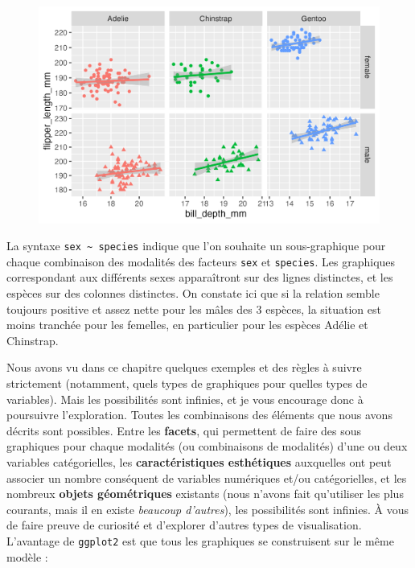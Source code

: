 \documentclass[
  letterpaper,
  DIV=11,
  numbers=noendperiod]{scrreprt}
\begin{document}
\begin{figure}[H]

{\centering \includegraphics{./03-visualization_files/figure-pdf/unnamed-chunk-85-1.png}

}

\end{figure}

La syntaxe \texttt{sex\ \textasciitilde{}\ species} indique que l'on
souhaite un sous-graphique pour chaque combinaison des modalités des
facteurs \texttt{sex} et \texttt{species}. Les graphiques correspondant
aux différents sexes apparaîtront sur des lignes distinctes, et les
espèces sur des colonnes distinctes. On constate ici que si la relation
semble toujours positive et assez nette pour les mâles des 3 espèces, la
situation est moins tranchée pour les femelles, en particulier pour les
espèces Adélie et Chinstrap.

Nous avons vu dans ce chapitre quelques exemples et des règles à suivre
strictement (notamment, quels types de graphiques pour quelles types de
variables). Mais les possibilités sont infinies, et je vous encourage
donc à poursuivre l'exploration. Toutes les combinaisons des éléments
que nous avons décrits sont possibles. Entre les \textbf{facets}, qui
permettent de faire des sous graphiques pour chaque modalités (ou
combinaisons de modalités) d'une ou deux variables catégorielles, les
\textbf{caractéristiques esthétiques} auxquelles ont peut associer un
nombre conséquent de variables numériques et/ou catégorielles, et les
nombreux \textbf{objets géométriques} existants (nous n'avons fait
qu'utiliser les plus courants, mais il en existe \emph{beaucoup
d'autres}), les possibilités sont infinies. À vous de faire preuve de
curiosité et d'explorer d'autres types de visualisation. L'avantage de
\texttt{ggplot2} est que tous les graphiques se construisent sur le même
modèle :
\end{document}
